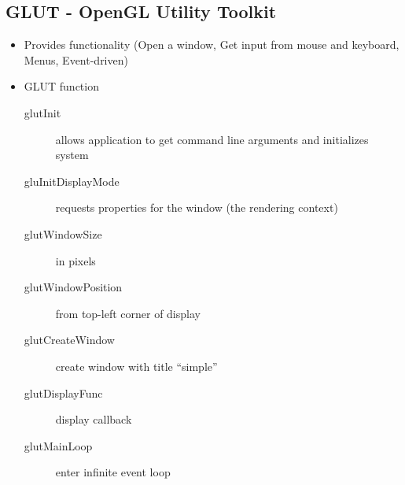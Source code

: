 \documentclass[11pt,a4paper]{article}
\begin{document}
	\subsection{GLUT - OpenGL Utility Toolkit}
		\begin{itemize}
			\item  Provides functionality (Open a window, Get input from mouse and keyboard, Menus, Event-driven)
			\item GLUT function
				\begin{description}
					\item[glutInit] allows application to get command line arguments and initializes system
					\item[gluInitDisplayMode] requests properties for the window (the rendering context) 	
					\item[glutWindowSize] in pixels
					\item[glutWindowPosition] from top-left corner of display 	
					\item[glutCreateWindow] create window with title “simple” 	
					\item[glutDisplayFunc] display callback
					\item[glutMainLoop] enter infinite event loop						
				\end{description}
		\end{itemize}
\end{document}

